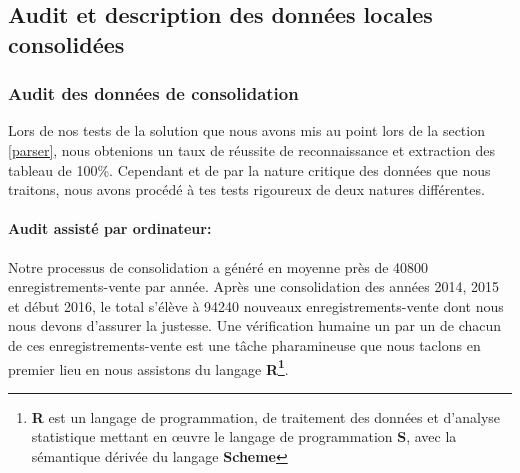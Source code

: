	\subsection{Audit et description des données locales consolidées}
	\subsubsection{Audit des données de consolidation}
	Lors de nos tests de la solution que nous avons mis au point lors de la section \ref{parser}, nous obtenions un taux de réussite de reconnaissance et extraction des tableau de 100\%. Cependant et de par la nature critique des données que nous traitons, nous avons procédé à tes tests rigoureux de deux natures différentes.
	\paragraph{Audit assisté par ordinateur:\\}
	Notre processus de consolidation a généré en moyenne près de 40800 enregistrements-vente par année. Après une consolidation des années 2014, 2015 et début 2016, le total s'élève à 94240 nouveaux enregistrements-vente dont nous nous devons d'assurer la justesse. Une vérification humaine un par un de chacun de ces enregistrements-vente est une tâche pharamineuse que nous taclons en premier lieu en nous assistons du langage \textbf{R\footnote{\textbf{R} est un langage de programmation, de traitement des données et d'analyse statistique mettant en œuvre le langage de programmation \textbf{S}, avec la sémantique dérivée du langage \textbf{Scheme}}}.
